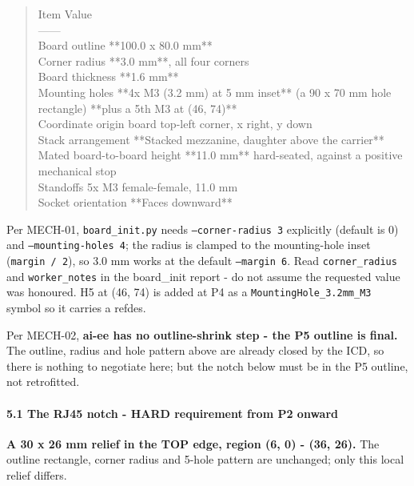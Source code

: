 \documentclass[11pt,a4paper]{article}
\begin{document}
\begin{quote}\small\ttfamily\raggedright
\textbar{} Item \textbar{} Value \textbar{}\\
\textbar{}---\textbar{}---\textbar{}\\
\textbar{} Board outline \textbar{} {*}{*}100.0 x 80.0 mm{*}{*} \textbar{}\\
\textbar{} Corner radius \textbar{} {*}{*}3.0 mm{*}{*}, all four corners \textbar{}\\
\textbar{} Board thickness \textbar{} {*}{*}1.6 mm{*}{*} \textbar{}\\
\textbar{} Mounting holes \textbar{} {*}{*}4x M3 (3.2 mm) at 5 mm inset{*}{*} (a 90 x 70 mm hole rectangle) {*}{*}plus a 5th M3 at (46, 74){*}{*} \textbar{}\\
\textbar{} Coordinate origin \textbar{} board top-left corner, x right, y down \textbar{}\\
\textbar{} Stack arrangement \textbar{} {*}{*}Stacked mezzanine, daughter above the carrier{*}{*} \textbar{}\\
\textbar{} Mated board-to-board height \textbar{} {*}{*}11.0 mm{*}{*} hard-seated, against a positive mechanical stop \textbar{}\\
\textbar{} Standoffs \textbar{} 5x M3 female-female, 11.0 mm \textbar{}\\
\textbar{} Socket orientation \textbar{} {*}{*}Faces downward{*}{*} \textbar{}
\end{quote}
Per MECH-01, \texttt{board\_init.py} needs \texttt{--corner-radius 3} explicitly (default is 0) and \texttt{--mounting-holes 4}; the radius is clamped to the mounting-hole inset (\texttt{margin / 2}), so 3.0 mm works at the default \texttt{--margin 6}. Read \texttt{corner\_radius} and \texttt{worker\_notes} in the board\_init report - do not assume the requested value was honoured. H5 at (46, 74) is added at P4 as a \texttt{MountingHole\_3.2mm\_M3} symbol so it carries a refdes.

Per MECH-02, \textbf{ai-ee has no outline-shrink step - the P5 outline is final.} The outline, radius and hole pattern above are already closed by the ICD, so there is nothing to negotiate here; but the notch below must be in the P5 outline, not retrofitted.

\paragraph*{5.1 The RJ45 notch - HARD requirement from P2 onward}
\textbf{A 30 x 26 mm relief in the TOP edge, region (6, 0) - (36, 26).} The outline rectangle, corner radius and 5-hole pattern are unchanged; only this local relief differs.
\end{document}
